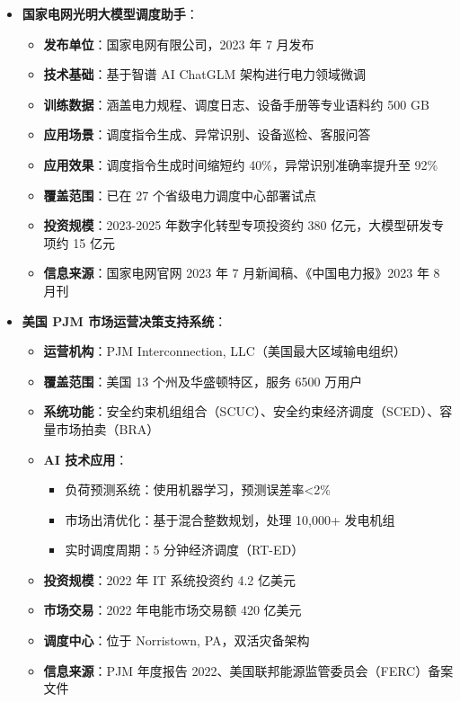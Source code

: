 \documentclass[12pt,a4paper]{article}
\begin{document}
\begin{itemize}
    \item \textbf{国家电网光明大模型调度助手}：
    \begin{itemize}
        \item \textbf{发布单位}：国家电网有限公司，2023 年 7 月发布
        \item \textbf{技术基础}：基于智谱 AI ChatGLM 架构进行电力领域微调
        \item \textbf{训练数据}：涵盖电力规程、调度日志、设备手册等专业语料约 500 GB
        \item \textbf{应用场景}：调度指令生成、异常识别、设备巡检、客服问答
        \item \textbf{应用效果}：调度指令生成时间缩短约 40\%，异常识别准确率提升至 92\%
        \item \textbf{覆盖范围}：已在 27 个省级电力调度中心部署试点
        \item \textbf{投资规模}：2023-2025 年数字化转型专项投资约 380 亿元，大模型研发专项约 15 亿元
        \item \textbf{信息来源}：国家电网官网 2023 年 7 月新闻稿、《中国电力报》2023 年 8 月刊\cite{sgcc2023digital}
    \end{itemize}
    
    \item \textbf{美国 PJM 市场运营决策支持系统}：
    \begin{itemize}
        \item \textbf{运营机构}：PJM Interconnection, LLC（美国最大区域输电组织）
        \item \textbf{覆盖范围}：美国 13 个州及华盛顿特区，服务 6500 万用户
        \item \textbf{系统功能}：安全约束机组组合（SCUC）、安全约束经济调度（SCED）、容量市场拍卖（BRA）
        \item \textbf{AI 技术应用}：
        \begin{itemize}
            \item 负荷预测系统：使用机器学习，预测误差率<2\%
            \item 市场出清优化：基于混合整数规划，处理 10,000+ 发电机组
            \item 实时调度周期：5 分钟经济调度（RT-ED）
        \end{itemize}
        \item \textbf{投资规模}：2022 年 IT 系统投资约 4.2 亿美元
        \item \textbf{市场交易}：2022 年电能市场交易额 420 亿美元
        \item \textbf{调度中心}：位于 Norristown, PA，双活灾备架构
        \item \textbf{信息来源}：PJM 年度报告 2022、美国联邦能源监管委员会（FERC）备案文件\cite{pjm2022annual}
    \end{itemize}
    

\end{itemize}
\end{document}
